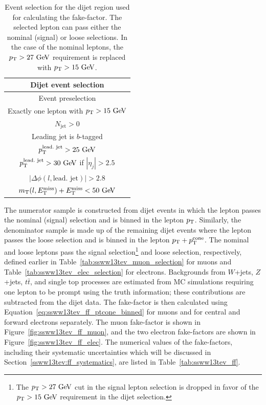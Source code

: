 \begin{table}[hbtp]
  \centering
  \begin{tabular}{c}
    Dijet event selection \\
    \hline\hline
    Event preselection\\
    Exactly one lepton with $\pt > 15\gev$\\
    $N_{\textrm{jet}} > 0$ \\
    Leading jet is $b$-tagged \\
    $\pt^{\textrm{lead.\ jet}} > 25\gev$\\
    $\pt^{\textrm{lead.\ jet}} > 30\gev$ if $|\eta_j| > 2.5$ \\
    $|\Delta\phi(l,\textrm{lead.\ jet})| > 2.8$ \\
    $m_{\textrm{T}}(l,\met) + \met < 50\gev$ \\
    \hline
  \end{tabular}
  \caption{Event selection for the dijet region used for calculating the fake-factor. The selected lepton can pass either the nominal (signal) or loose selections.  In the case of the nominal leptons, the $\pt > 27\gev$ requirement is replaced with $\pt > 15\gev$.}
  \label{tab:ssww13tev_dijet_cr}
\end{table}

The numerator sample is constructed from dijet events in which the lepton passes the nominal (signal) selection and is binned in the lepton $p_{\mathrm{T}}$.
Similarly, the denominator sample is made up of the remaining dijet events where the lepton passes the loose selection and is binned in the lepton $p_{\mathrm{T}}+p_{\mathrm{T}}^{\textrm{cone}}$.
The nominal and loose leptons pass the signal selection\footnote{The $\pt > 27\gev$ cut in the signal lepton selection is dropped in favor of the $\pt > 15\gev$ requirement in the dijet selection.} and loose selection, respectively, defined earlier in Table~\ref{tab:ssww13tev_muon_selection} for muons and Table~\ref{tab:ssww13tev_elec_selection} for electrons.
Backgrounds from $W$+jets, $Z$+jets, $t\bar{t}$, and single top processes are estimated from MC simulations requiring one lepton to be prompt using the truth information; these contributions are subtracted from the dijet data.
The fake-factor is then calculated using Equation~\ref{eq:ssww13tev_ff_ptcone_binned} for muons and for central and forward electrons separately.
The muon fake-factor is shown in Figure~\ref{fig:ssww13tev_ff_muon}, and the two electron fake-factors are shown in Figure~\ref{fig:ssww13tev_ff_elec}.
The numerical values of the fake-factors, including their systematic uncertainties which will be discussed in Section~\ref{ssww13tev:ff_systematics}, are listed in Table~\ref{tab:ssww13tev_ff}.


